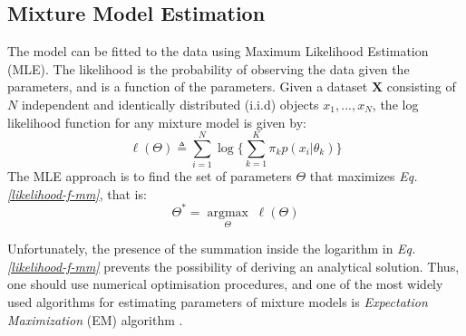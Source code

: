 \subsection{Mixture Model Estimation} \label{mixt-model-estimation-l-subsect}
The model can be fitted to the data using Maximum Likelihood Estimation (MLE). The likelihood is the probability of observing the data given the parameters, and is a function of the parameters. Given a dataset $\mathbf{X}$ consisting of $N$ independent and identically distributed (i.i.d) objects $x_{1}, ..., x_{N}$, the log likelihood function for any mixture model is given by:
\begin{equation} \label{likelihood-f-mm}
	\ell(\Theta) \triangleq \sum_{i=1}^{N} \log \bigg\lbrace \sum_{k=1}^{K}\pi_{k}p(x_{i}|\theta_{k})\bigg\rbrace
\end{equation}
The MLE approach is to find the set of parameters $\Theta$ that maximizes \emph{Eq. \ref{likelihood-f-mm}}, that is:
\begin{equation} \label{MLE-f-mm}
	\Theta^{*} =  \underset{\Theta}{\operatorname{argmax}} \; \ell(\Theta)
\end{equation}

Unfortunately, the presence of the summation inside the logarithm in \emph{Eq. \ref{likelihood-f-mm}} prevents the possibility of deriving an analytical solution. Thus, one should use numerical optimisation procedures, and one of the most widely used algorithms for estimating parameters of mixture models is \emph{Expectation Maximization} (EM) algorithm \citep{Dempster1977}. 